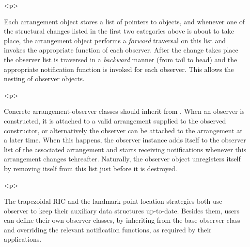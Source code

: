 \begin{ccHtmlOnly}<p>\end{ccHtmlOnly}
Each arrangement object stores a list of pointers to
 objects, and whenever one of the structural
changes listed in the first two categories above is about to take
place, the arrangement object performs a {\em forward} traversal
on this list and invokes the appropriate function of each
observer. After the change takes place the observer list is
traversed in a {\em backward} manner (from tail to head) and the
appropriate notification function is invoked for each observer.
This allows the nesting of observer objects.

\begin{ccHtmlOnly}<p>\end{ccHtmlOnly}
Concrete arrangement-observer classes should inherit from
. When an observer is constructed, it is attached to
a valid arrangement supplied to the observed constructor, or alternatively 
the observer can be attached to the arrangement at a later time.
When this happens, the observer instance adds itself to the
observer list of the associated arrangement and starts receiving
notifications whenever this arrangement changes tehreafter. Naturally,
the observer object unregisters itself by removing itself from
this list just before it is destroyed.

\begin{ccHtmlOnly}<p>\end{ccHtmlOnly}
The trapezoidal RIC and the landmark point-location strategies
both use observer to keep their auxiliary data structures
up-to-date. Besides them, users can define their own observer
classes, by inheriting from the base observer class and overriding
the relevant notification functions, as required by their
applications.

